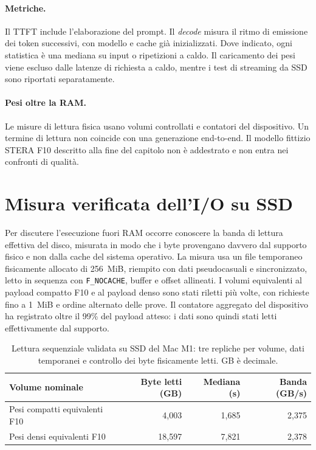 \paragraph{Metriche.} Il TTFT include l'elaborazione del prompt. Il \emph{decode} misura il ritmo di emissione dei token successivi, con modello e cache già inizializzati. Dove indicato, ogni statistica è una mediana su input o ripetizioni a caldo. Il caricamento dei pesi viene escluso dalle latenze di richiesta a caldo, mentre i test di streaming da SSD sono riportati separatamente.

\paragraph{Pesi oltre la RAM.} Le misure di lettura fisica usano volumi controllati e contatori del dispositivo. Un termine di lettura non coincide con una generazione end-to-end. Il modello fittizio STERA F10 descritto alla fine del capitolo non è addestrato e non entra nei confronti di qualità.

\section{Misura verificata dell'I/O su SSD}
\label{sec:ssd-io-verificato}

Per discutere l'esecuzione fuori RAM occorre conoscere la banda di lettura effettiva del disco, misurata in modo che i byte provengano davvero dal supporto fisico e non dalla cache del sistema operativo. La misura usa un file temporaneo fisicamente allocato di 256~MiB, riempito con dati pseudocasuali e sincronizzato, letto in sequenza con \texttt{F\_NOCACHE}, buffer e offset allineati. I volumi equivalenti al payload compatto F10 e al payload denso sono stati riletti più volte, con richieste fino a 1~MiB e ordine alternato delle prove. Il contatore aggregato del dispositivo ha registrato oltre il 99\% del payload atteso: i dati sono quindi stati letti effettivamente dal supporto.

\begin{table}[htbp]
\centering
\small
\begin{tabular}{lrrr}
\toprule
Volume nominale & Byte letti (GB) & Mediana (s) & Banda (GB/s) \\
\midrule
Pesi compatti equivalenti F10 & 4,003 & 1,685 & 2,375 \\
Pesi densi equivalenti F10 & 18,597 & 7,821 & 2,378 \\
\bottomrule
\end{tabular}
\caption{Lettura sequenziale validata su SSD del Mac M1: tre repliche per volume, dati temporanei e controllo dei byte fisicamente letti. GB è decimale.}
\label{tab:ssd-io-validato}
\end{table}

